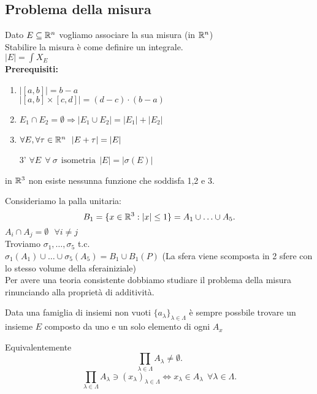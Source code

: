 \documentclass{article}
\begin{document}
 \subsection{Problema della misura} 
 Dato $E\subseteq\mathbb{R}^n$ vogliamo associare la sua misura (in $\mathbb{R}^n$)\\
 Stabilire la misura è come definire un integrale.\\
  $|E| = \int X_E$\\
  \textbf{Prerequisiti:}\\
  \begin{enumerate}
\item$ |[a,b]| = b-a$\\
$|[a,b]\times[c,d]| = (d-c) \cdot (b-a)$
 \item$ E_1\cap E_2 = \emptyset \Rightarrow |E_1\cup E_2| = |E_1| + |E_2|$
 \item $\forall E, \forall \tau\in\R^n \ \ |E+\tau| = |E|$
 \item[3'] $\forall E \ \ \forall \ \sigma \ \ \text{isometria} \ \ |E| = |\sigma(E)|$
  \end{enumerate}
  \begin{teo}
  	in $\mathbb{R}^3$ non esiste nessunna funzione che soddisfa 1,2 e 3.
  \end{teo}
  Consideriamo la palla unitaria:
  \[
	  B_1 = \{x\in\mathbb{R}^3 : |x|\leq 1\} = A_1\cup\ldots\cup A_5
  .\]  
  $A_i\cap A_j = \emptyset \ \ \ \forall i\neq j$ \\
  Troviamo $\sigma_1,\ldots,\sigma_5$ t.c.\\
  $\sigma_1(A_1)\cup\ldots\cup\sigma_5(A_5) = B_1\cup B_1(P)$ (La sfera viene scomposta in 2 sfere con lo stesso volume della sferainiziale)\\
  Per avere una teoria consistente dobbiamo studiare il  problema della misura rinunciando alla proprietà di additività.\\
  \begin{ass}
	  Data una famiglia di insiemi non vuoti $\{a_\lambda\}_{\lambda\in\Lambda}$ è sempre possbile trovare un insieme $E$ composto da uno e un solo elemento di ogni $A_x$
  \end{ass}
  Equivalentemente
  \[
	  \prod_{\lambda\in\Lambda} A_\lambda \neq \emptyset
  .\] 
  \[
	   \prod_{\lambda\in\Lambda} A_\lambda\ni(x_\lambda)_{\lambda\in\Lambda} \Leftrightarrow x_\lambda\in A_\lambda \ \ \forall \lambda\in\Lambda
  .\]

\end{document}
